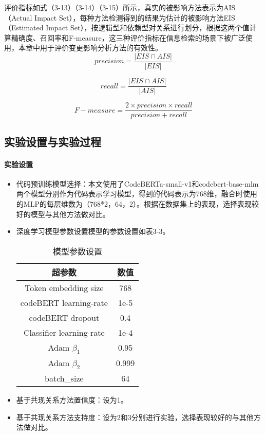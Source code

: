 评价指标如式（3-13）（3-14）（3-15）所示，真实的被影响方法表示为AIS（Actual Impact Set），每种方法检测得到的结果为估计的被影响方法EIS（Estimated Impact Set），按逻辑型和依赖型对关系进行划分，根据这两个值计算精确度、召回率和F-measure，这三种评价指标在信息检索的场景下被广泛使用，本章中用于评价变更影响分析方法的有效性。
\begin{equation}
{precision} = \frac{|EIS \cap AIS|}{|EIS|}
\end{equation}

\begin{equation}
{recall} = \frac{|EIS \cap AIS|}{|AIS|}
\end{equation}

\begin{equation}
F-measure = \frac{2 \times precision \times recall}{precision + recall}
\end{equation}

\subsection{实验设置与实验过程}

\paragraph{实验设置}

\begin{itemize}
    \item 代码预训练模型选择：本文使用了CodeBERTa-small-v1和codebert-base-mlm两个模型分别作为代码表示学习模型，得到的代码表示为768维，融合时使用的MLP的每层维数为（768*2，64，2）。根据在数据集上的表现，选择表现较好的模型与其他方法做对比。
    
    \item 深度学习模型参数设置模型的参数设置如表3-3。

    \begin{table}[htbp]
    \caption{模型参数设置}
    \vspace{0.5em}\centering\wuhao
    \begin{tabular}{cc}
    \toprule
    超参数 & 数值  \\
    \midrule
    Token embedding size & 768 \\
    codeBERT learning-rate  & 1e-5 \\
    codeBERT dropout & 0.4 \\
    Classifier learning-rate& 1e-4 \\ 
    Adam $\beta_1$  & 0.95  \\
    Adam $\beta_2$ & 0.999  \\
    batch\_size & 64 \\
    \bottomrule
    \end{tabular}
    \end{table}   

    \item 基于共现关系方法置信度：设为1。

    \item 基于共现关系方法支持度：设为2和3分别进行实验，选择表现较好的与其他方法做对比。
    
\end{itemize}


